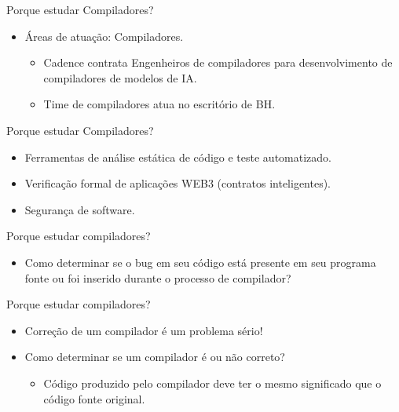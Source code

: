 \begin{frame}{Porque estudar Compiladores?}

    \begin{itemize}

        \item
        Áreas de atuação: Compiladores.

        \begin{itemize}

            \item
            Cadence contrata Engenheiros de compiladores para desenvolvimento de
            compiladores de modelos de IA.
            \item
            Time de compiladores atua no escritório de BH.
        \end{itemize}
    \end{itemize}
\end{frame}

\begin{frame}{Porque estudar Compiladores?}

    \begin{itemize}

        \item
        Ferramentas de análise estática de código e teste automatizado.
        \item
        Verificação formal de aplicações WEB3 (contratos inteligentes).
        \item
        Segurança de software.
    \end{itemize}
\end{frame}

\begin{frame}{Porque estudar compiladores?}

    \begin{itemize}

        \item
        Como determinar se o bug em seu código está presente em seu programa
        fonte ou foi inserido durante o processo de compilador?
    \end{itemize}
\end{frame}

\begin{frame}{Porque estudar compiladores?}

    \begin{itemize}
        \item
        Correção de um compilador é um problema sério!
        \item
        Como determinar se um compilador é ou não correto?

        \begin{itemize}

            \item
            Código produzido pelo compilador deve ter o mesmo significado que o
            código fonte original.
        \end{itemize}
    \end{itemize}
\end{frame}

